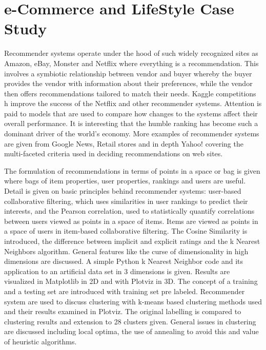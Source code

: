 

\chapter{e-Commerce and LifeStyle Case Study}

\FILENAME

Recommender systems operate under the hood of such widely recognized
sites as Amazon, eBay, Monster and Netflix where everything is a
recommendation. This involves a symbiotic relationship between vendor
and buyer whereby the buyer provides the vendor with information about
their preferences, while the vendor then offers recommendations tailored
to match their needs. Kaggle competitions h improve the success of the
Netflix and other recommender systems. Attention is paid to models that
are used to compare how changes to the systems affect their overall
performance. It is interesting that the humble ranking has become such a
dominant driver of the world's economy. More examples of recommender
systems are given from Google News, Retail stores and in depth Yahoo!
covering the multi-faceted criteria used in deciding recommendations on
web sites.

The formulation of recommendations in terms of points in a space or bag
is given where bags of item properties, user properties, rankings and
users are useful. Detail is given on basic principles behind recommender
systems: user-based collaborative filtering, which uses similarities in
user rankings to predict their interests, and the Pearson correlation,
used to statistically quantify correlations between users viewed as
points in a space of items. Items are viewed as points in a space of
users in item-based collaborative filtering. The Cosine Similarity is
introduced, the difference between implicit and explicit ratings and the
k Nearest Neighbors algorithm. General features like the curse of
dimensionality in high dimensions are discussed. A simple Python k
Nearest Neighbor code and its application to an artificial data set in 3
dimensions is given. Results are visualized in Matplotlib in 2D and with
Plotviz in 3D. The concept of a training and a testing set are
introduced with training set pre labeled. Recommender system are used to
discuss clustering with k-means based clustering methods used and their
results examined in Plotviz. The original labelling is compared to
clustering results and extension to 28 clusters given. General issues in
clustering are discussed including local optima, the use of annealing to
avoid this and value of heuristic algorithms.

